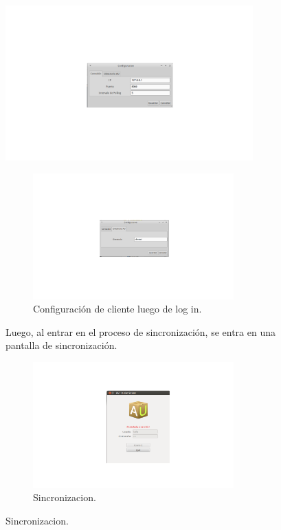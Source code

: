 \documentclass{article}
\begin{document}
	\begin{figure}[h]
       \centering
       \includegraphics[width=0.85\textwidth]{configuracionCliente.png}
	\bigskip
       \caption{Configuración de cliente antes de log in.}
	\begin{figure}[h]
       \centering
       \includegraphics[width=0.85\textwidth]{configuracionCliente2.png}
	\bigskip
       \caption{Configuración de cliente luego de log in.}
	\end{figure}
	Luego, al entrar en el proceso de sincronización, se entra en una pantalla de sincronización.
	\begin{figure}[h]
       \centering
       \includegraphics[width=0.85\textwidth]{Sincronizando.png}
	\bigskip
       \caption{Sincronizacion.}
	\end{figure}
\bigskip





\end{figure}
\end{document}
